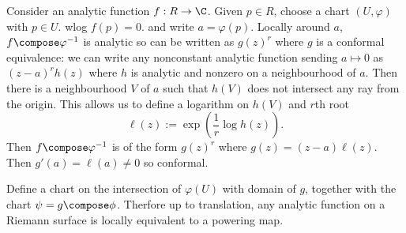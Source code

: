 \documentclass[a4paper]{article}
\begin{document}
Consider an analytic function \(f: R \to \C\). Given \(p \in R\), choose a chart \((U, \varphi)\) with \(p \in U\). wlog \(f(p) = 0\). and write \(a = \varphi(p)\). Locally around \(a\), \(f \compose \varphi^{-1}\) is analytic so can be written as \(g(z)^r\) where \(g\) is a conformal equivalence: we can write any nonconstant analytic function sending \(a \mapsto 0\) as \((z - a)^r h(z)\) where \(h\) is analytic and nonzero on a neighbourhood of \(a\). Then there is a neighbourhood \(V\) of \(a\) such that \(h(V)\) does not intersect any ray from the origin. This allows us to define a logarithm on \(h(V)\) and \(r\)th root
\[
  \ell(z) := \exp( \frac{1}{r} \log h(z)).
\]
Then \(f \compose \varphi^{-1}\) is of the form \(g(z)^r\) where \(g(z) = (z - a)\ell(z)\). Then \(g'(a) = \ell(a) \neq 0\) so conformal.

Define a chart on the intersection of \(\varphi(U)\) with domain of \(g\), together with the chart \(\psi = g \compose \phi\). Therfore up to translation, any analytic function on a Riemann surface is locally equivalent to a powering map.




\printindex
\end{document}
